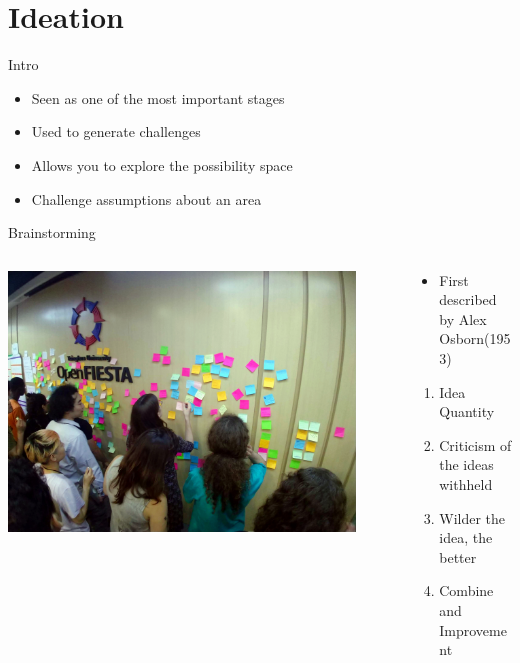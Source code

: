 \part{Ideation}
\frame{\partpage}

\begin{frame}{Intro}
	\begin{itemize}
		\item Seen as one of the most important stages
		\item Used to generate challenges
		\item Allows you to explore the possibility space
		\item Challenge assumptions about an area
	\end{itemize}
\end{frame}

\begin{frame}{Brainstorming}
	\begin{columns}
		\begin{column}{0.48\textwidth}
			\includegraphics[width=0.9\textwidth, height=0.7\textheight]{brain_storming}
		\end{column}
		\begin{column}{0.48\textwidth}
			\begin{itemize}
				\item First described by Alex Osborn(1953)
			\end{itemize}
			\begin{enumerate}
				\item Idea Quantity
				\item Criticism of the ideas withheld
				\item Wilder the idea, the better
				\item Combine and Improvement
			\end{enumerate}
		\end{column}
	\end{columns}
\end{frame}

